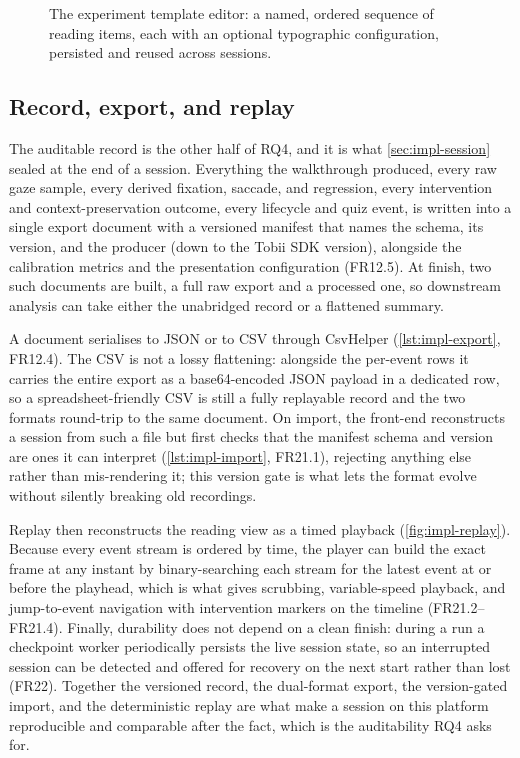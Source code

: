 \begin{figure}[htbp]
\centering
{}
\caption[The experiment template editor.]{The experiment template editor: a named, ordered sequence of reading items, each with an optional typographic configuration, persisted and reused across sessions.}
\label{fig:impl-template}
\end{figure}

\FloatBarrier
\subsection{Record, export, and replay}
\label{sec:impl-replay}

The auditable record is the other half of RQ4, and it is what \cref{sec:impl-session} sealed at the end of a session.
Everything the walkthrough produced, every raw gaze sample, every derived fixation, saccade, and regression, every intervention and context-preservation outcome, every lifecycle and quiz event, is written into a single export document with a versioned manifest that names the schema, its version, and the producer (down to the Tobii SDK version), alongside the calibration metrics and the presentation configuration (FR12.5).
At finish, two such documents are built, a full raw export and a processed one, so downstream analysis can take either the unabridged record or a flattened summary.

A document serialises to JSON or to CSV through CsvHelper (\cref{lst:impl-export}, FR12.4).
The CSV is not a lossy flattening: alongside the per-event rows it carries the entire export as a base64-encoded JSON payload in a dedicated row, so a spreadsheet-friendly CSV is still a fully replayable record and the two formats round-trip to the same document.
On import, the front-end reconstructs a session from such a file but first checks that the manifest schema and version are ones it can interpret (\cref{lst:impl-import}, FR21.1), rejecting anything else rather than mis-rendering it; this version gate is what lets the format evolve without silently breaking old recordings.

Replay then reconstructs the reading view as a timed playback (\cref{fig:impl-replay}).
Because every event stream is ordered by time, the player can build the exact frame at any instant by binary-searching each stream for the latest event at or before the playhead, which is what gives scrubbing, variable-speed playback, and jump-to-event navigation with intervention markers on the timeline (FR21.2--FR21.4).
Finally, durability does not depend on a clean finish: during a run a checkpoint worker periodically persists the live session state, so an interrupted session can be detected and offered for recovery on the next start rather than lost (FR22).
Together the versioned record, the dual-format export, the version-gated import, and the deterministic replay are what make a session on this platform reproducible and comparable after the fact, which is the auditability RQ4 asks for.

